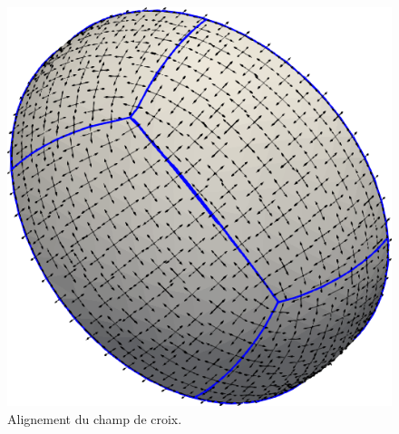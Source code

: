 \begin{figure}[!h]
\centering
\includegraphics[scale=0.38]{images/align.png}
\caption{Alignement du champ de croix.}
\label{align}
\end{figure}

